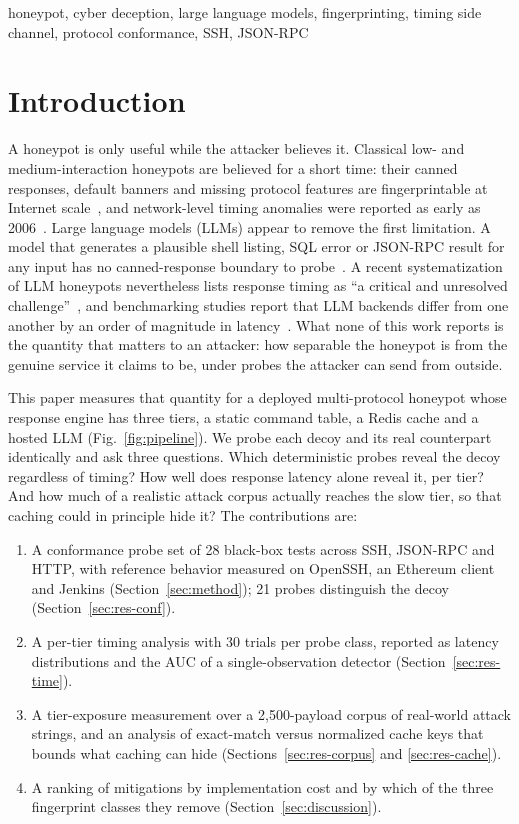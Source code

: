 \documentclass[conference]{IEEEtran}
\begin{document}
\begin{IEEEkeywords}
honeypot, cyber deception, large language models, fingerprinting, timing side channel, protocol conformance, SSH, JSON-RPC
\end{IEEEkeywords}

\section{Introduction}
A honeypot is only useful while the attacker believes it. Classical low- and medium-interaction honeypots are believed for a short time: their canned responses, default banners and missing protocol features are fingerprintable at Internet scale~\cite{ref3,ref4}, and network-level timing anomalies were reported as early as 2006~\cite{ref2}. Large language models (LLMs) appear to remove the first limitation. A model that generates a plausible shell listing, SQL error or JSON-RPC result for any input has no canned-response boundary to probe~\cite{ref5,ref6,ref7,ref8}. A recent systematization of LLM honeypots nevertheless lists response timing as ``a critical and unresolved challenge''~\cite{ref9}, and benchmarking studies report that LLM backends differ from one another by an order of magnitude in latency~\cite{ref10,ref11}. What none of this work reports is the quantity that matters to an attacker: how separable the honeypot is from the genuine service it claims to be, under probes the attacker can send from outside.

This paper measures that quantity for a deployed multi-protocol honeypot whose response engine has three tiers, a static command table, a Redis cache and a hosted LLM (Fig.~\ref{fig:pipeline}). We probe each decoy and its real counterpart identically and ask three questions. Which deterministic probes reveal the decoy regardless of timing? How well does response latency alone reveal it, per tier? And how much of a realistic attack corpus actually reaches the slow tier, so that caching could in principle hide it? The contributions are:
\begin{enumerate}
\item A conformance probe set of 28 black-box tests across SSH, JSON-RPC and HTTP, with reference behavior measured on OpenSSH, an Ethereum client and Jenkins (Section~\ref{sec:method}); 21 probes distinguish the decoy (Section~\ref{sec:res-conf}).
\item A per-tier timing analysis with 30 trials per probe class, reported as latency distributions and the AUC of a single-observation detector (Section~\ref{sec:res-time}).
\item A tier-exposure measurement over a 2,500-payload corpus of real-world attack strings, and an analysis of exact-match versus normalized cache keys that bounds what caching can hide (Sections~\ref{sec:res-corpus} and \ref{sec:res-cache}).
\item A ranking of mitigations by implementation cost and by which of the three fingerprint classes they remove (Section~\ref{sec:discussion}).
\end{enumerate}
\end{document}
